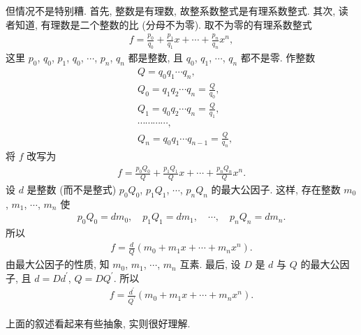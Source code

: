 但情况不是特别糟. 首先, 整数是有理数, 故整系数整式是有理系数整式. 其次, 读者知道, 有理数是二个整数的比 (分母不为零). 取不为零的有理系数整式
\begin{align*}
    f = \frac{p_0}{q_0} + \frac{p_1}{q_1} x + \cdots + \frac{p_n}{q_n} x^n,
\end{align*}
这里 $p_0$, $q_0$, $p_1$, $q_0$, $\cdots$, $p_n$, $q_n$ 都是整数, 且 $q_0$, $q_1$, $\cdots$, $q_n$ 都不是零. 作整数
\begin{align*}
     & Q = q_0 q_1 \cdots q_n,                       \\
     & Q_0 = q_1 q_2 \cdots q_n = \frac{Q}{q_0},     \\
     & Q_1 = q_0 q_2 \cdots q_n = \frac{Q}{q_1},     \\
     & \cdots \cdots \cdots \cdots,                  \\
     & Q_n = q_0 q_1 \cdots q_{n-1} = \frac{Q}{q_n},
\end{align*}
将 $f$ 改写为
\begin{align*}
    f = \frac{p_0 Q_0}{Q} + \frac{p_1 Q_1}{Q} x + \cdots + \frac{p_n Q_n}{Q} x^n.
\end{align*}
设 $d$ 是整数 (而不是整式) $p_0 Q_0$, $p_1 Q_1$, $\cdots$, $p_n Q_n$ 的最大公因子. 这样, 存在整数 $m_0$, $m_1$, $\cdots$, $m_n$ 使
\begin{align*}
    p_0 Q_0 = d m_0, \quad p_1 Q_1 = d m_1, \quad \cdots, \quad p_n Q_n = d m_n.
\end{align*}
所以
\begin{align*}
    f = \frac{d}{Q} (m_0 + m_1 x + \cdots + m_n x^n).
\end{align*}
由最大公因子的性质, 知 $m_0$, $m_1$, $\cdots$, $m_n$ 互素. 最后, 设 $D$ 是 $d$ 与 $Q$ 的最大公因子, 且 $d = Dd^{\prime}$, $Q = DQ^{\prime}$. 所以
\begin{align*}
    f = \frac{d^{\prime}}{Q^{\prime}} (m_0 + m_1 x + \cdots + m_n x^n).
\end{align*}

上面的叙述看起来有些抽象, 实则很好理解.

